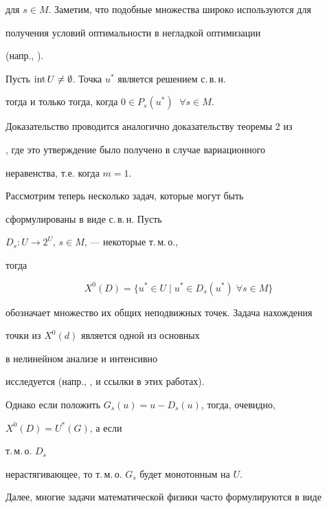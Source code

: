 для $s\in M$. Заметим, что подобные множества широко используются для


получения условий оптимальности в негладкой оптимизации


(напр., \cite{Dem}).





\begin{thms}


Пусть $\operatorname{int} U\ne\emptyset$. Точка $u^*$ является решением с.\,в.\,н.


тогда и только тогда, когда $0\in P_s(u^*)$ $\;\forall s\in M$.


\end{thms}





Доказательство проводится аналогично доказательству теоремы 2 из


\cite{Kon1}, где это утверждение было получено в случае вариационного


неравенства, т.е. когда $m=1$.





Рассмотрим теперь несколько задач, которые могут быть


сформулированы в виде с.\,в.\,н. Пусть


$D_s:U\to 2^U$, $s\in M$, --- некоторые т.\,м.\,о.,


тогда


$$


X^0(D)=\{u^*\in U\mid u^*\in D_s(u^*)\;\forall s\in M\}


$$


обозначает множество их общих неподвижных точек. Задача нахождения


точки из $X^0(d)$ является одной из основных


в нелинейном анализе и интенсивно


исследуется (напр., \cite{Bor}, \cite{Khan} и ссылки в этих работах).


Однако если положить $G_s(u)=u-D_s(u)$, тогда, очевидно,


$X^0(D)=U^*(G)$, а если


т.\,м.\,о. $D_s$


нерастягивающее, то т.\,м.\,о. $G_s$ будет монотонным на $U$.





Далее, многие задачи математической физики часто формулируются в виде


